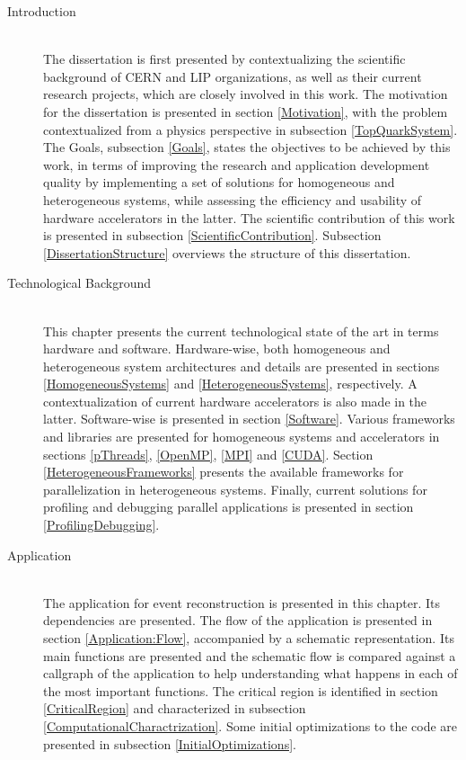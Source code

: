 \begin{description}
	\item[Introduction] \hfill \\
	The dissertation is first presented by contextualizing the scientific background of CERN and LIP organizations, as well as their current research projects, which are closely involved in this work. The motivation for the dissertation is presented in section \ref{Motivation}, with the problem contextualized from a physics perspective in subsection \ref{TopQuarkSystem}. The Goals, subsection \ref{Goals}, states the objectives to be achieved by this work, in terms of improving the research and application development quality by implementing a set of solutions for homogeneous and heterogeneous systems, while assessing the efficiency and usability of hardware accelerators in the latter. The scientific contribution of this work is presented in subsection \ref{ScientificContribution}. Subsection \ref{DissertationStructure} overviews the structure of this dissertation.
	\item[Technological Background] \hfill \\
	This chapter presents the current technological state of the art in terms hardware and software. Hardware-wise, both homogeneous and heterogeneous system architectures and details are presented in sections \ref{HomogeneousSystems} and \ref{HeterogeneousSystems}, respectively. A contextualization of current hardware accelerators is also made in the latter. Software-wise is presented in section \ref{Software}. Various frameworks and libraries are presented for homogeneous systems and accelerators in sections \ref{pThreads}, \ref{OpenMP}, \ref{MPI} and \ref{CUDA}. Section \ref{HeterogeneousFrameworks} presents the available frameworks for parallelization in heterogeneous systems. Finally, current solutions for profiling and debugging parallel applications is presented in section \ref{ProfilingDebugging}.
	\item[\tth Application] \hfill \\
	The \tth application for event reconstruction is presented in this chapter. Its dependencies are presented. The flow of the application is presented in section \ref{Application:Flow}, accompanied by a schematic representation. Its main functions are presented and the schematic flow is compared against a callgraph of the application to help understanding what happens in each of the most important functions. The critical region is identified in section \ref{CriticalRegion} and characterized in subsection \ref{ComputationalCharactrization}. Some initial optimizations to the code are presented in subsection \ref{InitialOptimizations}.

\end{description}
